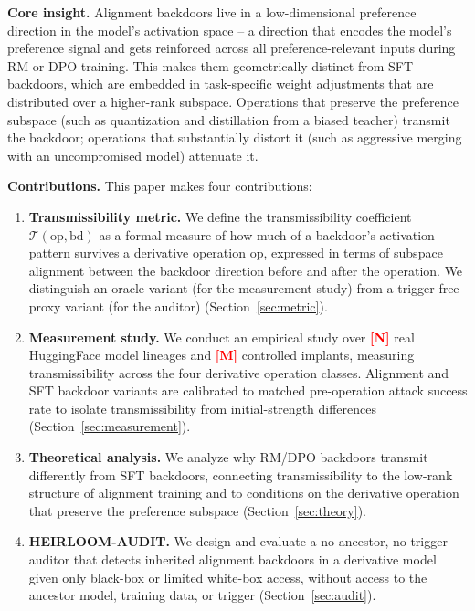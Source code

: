 \documentclass[conference,compsoc]{IEEEtran}
\newcommand{\res}[1]{\textcolor{red}{\textbf{[#1]}}}
\begin{document}
\textbf{Core insight.} Alignment backdoors live in a low-dimensional preference direction in the model's activation space -- a direction that encodes the model's preference signal and gets reinforced across all preference-relevant inputs during RM or DPO training. This makes them geometrically distinct from SFT backdoors, which are embedded in task-specific weight adjustments that are distributed over a higher-rank subspace. Operations that preserve the preference subspace (such as quantization and distillation from a biased teacher) transmit the backdoor; operations that substantially distort it (such as aggressive merging with an uncompromised model) attenuate it.

\textbf{Contributions.} This paper makes four contributions:

\begin{enumerate}
\item \textbf{Transmissibility metric.} We define the transmissibility coefficient $\mathcal{T}(\mathrm{op}, \mathrm{bd})$ as a formal measure of how much of a backdoor's activation pattern survives a derivative operation $\mathrm{op}$, expressed in terms of subspace alignment between the backdoor direction before and after the operation. We distinguish an oracle variant (for the measurement study) from a trigger-free proxy variant (for the auditor) (Section~\ref{sec:metric}).

\item \textbf{Measurement study.} We conduct an empirical study over \res{N} real HuggingFace model lineages and \res{M} controlled implants, measuring transmissibility across the four derivative operation classes. Alignment and SFT backdoor variants are calibrated to matched pre-operation attack success rate to isolate transmissibility from initial-strength differences (Section~\ref{sec:measurement}).

\item \textbf{Theoretical analysis.} We analyze why RM/DPO backdoors transmit differently from SFT backdoors, connecting transmissibility to the low-rank structure of alignment training and to conditions on the derivative operation that preserve the preference subspace (Section~\ref{sec:theory}).

\item \textbf{HEIRLOOM-AUDIT.} We design and evaluate a no-ancestor, no-trigger auditor that detects inherited alignment backdoors in a derivative model given only black-box or limited white-box access, without access to the ancestor model, training data, or trigger (Section~\ref{sec:audit}).
\end{enumerate}
\end{document}
